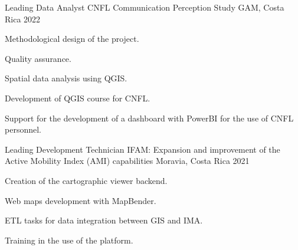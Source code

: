 \begin{cventries}
{\begin{cvitems}
    \end{cvitems}
  }
\cventry
  {Leading Data Analyst} %
  {CNFL Communication Perception Study} %
  {GAM, Costa Rica} %
  {2022} %
  {
    \begin{cvitems} %
      \item Methodological design of the project.
      \item Quality assurance.
      \item Spatial data analysis using QGIS.
      \item Development of QGIS course for CNFL.
      \item Support for the development of a dashboard with PowerBI for the use of CNFL
      personnel.
    \end{cvitems}
  }
\cventry
  {Leading Development Technician} %
  {IFAM: Expansion and improvement of the Active Mobility Index (AMI) capabilities} %
  {Moravia, Costa Rica} %
  {2021} %
  {
    \begin{cvitems} %
      \item Creation of the cartographic viewer backend.
      \item Web maps development with MapBender.
      \item ETL tasks for data integration between GIS and IMA.
      \item Training in the use of the platform.
    \end{cvitems}
  }
\end{cventries}